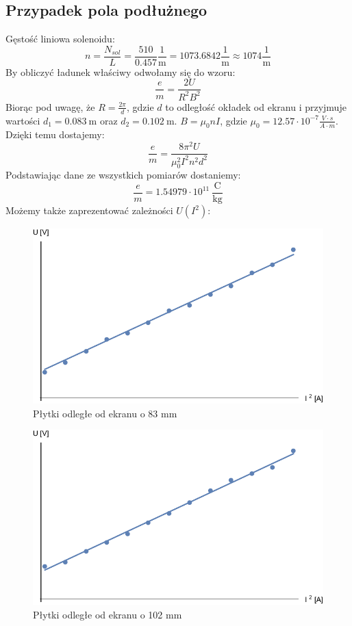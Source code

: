 \documentclass[paper=a4, fontsize=12pt]{scrartcl}
\begin{document}
\subsection{Przypadek pola podłużnego}
Gęstość liniowa solenoidu:
\begin{equation*}
n=\frac{N_{sol}}{L}=\frac{510}{0.457}\frac{1}{\mathrm{m}}=1073.6842\frac{1}{\mathrm{m}}\approx1074\frac{1}{\mathrm{m}}
\end{equation*}
By obliczyć ładunek właściwy odwołamy się do wzoru:
\begin{equation*}
\frac{e}{m}=\frac{2U}{R^2B^2}
\end{equation*}
Biorąc pod uwagę, że $R=\frac{2\pi}{d}$, gdzie $d$ to odległość okładek od ekranu i przyjmuje wartości $d_1=0.0	83\:\mathrm{m}$ oraz $d_2=0.102\:\mathrm{m}$. $B=\mu_0nI$, gdzie $\mu_0=12.57\cdot10^{-7}\frac{V\cdot s}{A\cdot m}$. Dzięki temu dostajemy:
\begin{equation*}
\frac{e}{m}=\frac{8\pi^2U}{\mu_0^2I^2n^2d^2}
\end{equation*}
Podstawiając dane ze wszystkich pomiarów dostaniemy:
\begin{equation}
\frac{e}{m}=1.54979\cdot10^{11}\:\mathrm{\frac{C}{kg}}
\end{equation}
Możemy także zaprezentować zależności $U(I^2)$:
\begin{figure}[h]
\centering
\includegraphics[width=0.7\linewidth]{wyk1}
\caption{Płytki odległe od ekranu o 83 mm}
\label{fig:wyk1}
\end{figure}
\begin{figure}[h]
	\centering
	\includegraphics[width=0.7\linewidth]{wyk2}
	\caption{Płytki odległe od ekranu o 102 mm}
	\label{fig:wyk2}
\end{figure}
\end{document}
